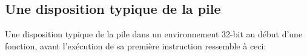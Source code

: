 \subsection{Une disposition typique de la pile }

Une disposition typique de la pile dans un environnement 32-bit au début d'une fonction,
avant l'exécution de sa première instruction ressemble à ceci:


